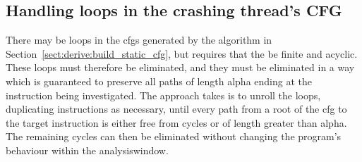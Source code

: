 \subsection{Handling loops in the crashing thread's CFG}
\label{sect:derive:handling_loops}

There may be loops in the \glspl{cfg} generated by the algorithm in
Section~\ref{sect:derive:build_static_cfg}, but {\technique} requires
that the {\StateMachines} be finite and acyclic.  These loops must
therefore be eliminated, and they must be eliminated in a way which is
guaranteed to preserve all paths of length \gls{alpha} ending at the
instruction being investigated.  The approach {\technique} takes is to
unroll the loops, duplicating instructions as necessary, until every
path from a root of the \gls{cfg} to the target instruction is either free
from cycles or of length greater than \gls{alpha}.  The remaining
cycles can then be eliminated without changing the program's behaviour
within the \gls{analysiswindow}.

